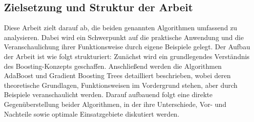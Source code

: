 \subsection{Zielsetzung und Struktur der Arbeit}
Diese Arbeit zielt darauf ab, die beiden genannten Algorithmen umfassend zu analysieren. Dabei wird ein Schwerpunkt auf die praktische Anwendung und die Veranschaulichung ihrer Funktionsweise durch eigene Beispiele gelegt. Der Aufbau der Arbeit ist wie folgt strukturiert: Zunächst wird ein grundlegendes Verständnis des Boosting-Konzepts geschaffen. Anschließend werden die Algorithmen AdaBoost und Gradient Boosting Trees detailliert beschrieben, wobei deren theoretische Grundlagen, Funktionsweisen im Vordergrund stehen, aber durch Beispiele veranschaulicht werden. Darauf aufbauend folgt eine direkte Gegenüberstellung beider Algorithmen, in der ihre Unterschiede, Vor- und Nachteile sowie optimale Einsatzgebiete diskutiert werden.